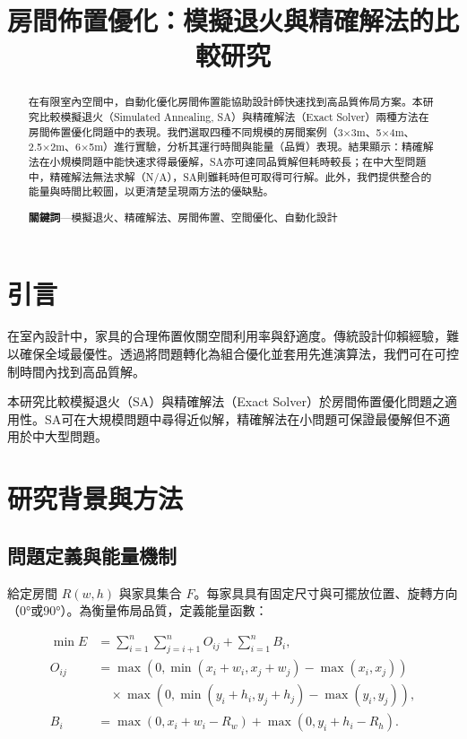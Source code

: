 \documentclass[conference]{IEEEtran}
\begin{document}
\title{房間佈置優化：模擬退火與精確解法的比較研究}

\author{
}

\maketitle

\begin{abstract}
在有限室內空間中，自動化優化房間佈置能協助設計師快速找到高品質佈局方案。本研究比較模擬退火（Simulated Annealing, SA）與精確解法（Exact Solver）兩種方法在房間佈置優化問題中的表現。我們選取四種不同規模的房間案例（3×3m、5×4m、2.5×2m、6×5m）進行實驗，分析其運行時間與能量（品質）表現。結果顯示：精確解法在小規模問題中能快速求得最優解，SA亦可達同品質解但耗時較長；在中大型問題中，精確解法無法求解（N/A），SA則雖耗時但可取得可行解。此外，我們提供整合的能量與時間比較圖，以更清楚呈現兩方法的優缺點。

\textbf{關鍵詞}---模擬退火、精確解法、房間佈置、空間優化、自動化設計
\end{abstract}

\section{引言}
在室內設計中，家具的合理佈置攸關空間利用率與舒適度。傳統設計仰賴經驗，難以確保全域最優性。透過將問題轉化為組合優化並套用先進演算法，我們可在可控制時間內找到高品質解。

本研究比較模擬退火（SA）與精確解法（Exact Solver）於房間佈置優化問題之適用性。SA可在大規模問題中尋得近似解\cite{b1}，精確解法在小問題可保證最優解但不適用於中大型問題\cite{b2}。

\section{研究背景與方法}
\subsection{問題定義與能量機制}
給定房間 \( R(w,h) \) 與家具集合 \( F \)。每家具具有固定尺寸與可擺放位置、旋轉方向（0°或90°）。為衡量佈局品質，定義能量函數：

\begin{align}
\min E &= \sum_{i=1}^{n}\sum_{j=i+1}^{n} O_{ij} + \sum_{i=1}^{n} B_i, \label{eq:energy} \\
O_{ij} &= \max\left(0, \min(x_i + w_i, x_j + w_j) - \max(x_i, x_j)\right) \nonumber \\
&\quad \times \max\left(0, \min(y_i + h_i, y_j + h_j) - \max(y_i, y_j)\right), \label{eq:overlap} \\
B_i &= \max\left(0, x_i + w_i - R_w\right) + \max\left(0, y_i + h_i - R_h\right). \label{eq:boundary}
\end{align}
\end{document}
